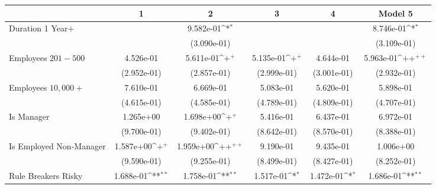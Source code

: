 {
\def\sym#1{\ifmmode^{#1}\else\(^{#1}\)\fi}
\begin{tabular}{l*{5}{c}}
    \toprule
                              & \multicolumn{1}{c}{1} & \multicolumn{1}{c}{2} & \multicolumn{1}{c}{3} & \multicolumn{1}{c}{4} & \multicolumn{1}{c}{Model 5} \\
    \midrule
    Duration 1 Year$+$        &                       & 9.582e-01\sym{*}      &                       &                       & 8.746e-01\sym{*}            \\
                              &                       & (3.090e-01)           &                       &                       & (3.109e-01)                 \\
    \addlinespace
    Employees $201-500$       & 4.526e-01             & 5.611e-01\sym{+}      & 5.135e-01\sym{+}      & 4.644e-01             & 5.963e-01\sym{++}           \\
                              & (2.952e-01)           & (2.857e-01)           & (2.999e-01)           & (3.001e-01)           & (2.932e-01)                 \\
    \addlinespace
    Employees $10,000+$       & 7.610e-01             & 6.669e-01             & 5.083e-01             & 5.620e-01             & 5.898e-01                   \\
                              & (4.615e-01)           & (4.585e-01)           & (4.789e-01)           & (4.809e-01)           & (4.707e-01)                 \\
    \addlinespace
    Is Manager                & 1.265e+00             & 1.698e+00\sym{+}      & 5.416e-01             & 6.437e-01             & 6.972e-01                   \\
                              & (9.700e-01)           & (9.402e-01)           & (8.642e-01)           & (8.570e-01)           & (8.388e-01)                 \\
    \addlinespace
    Is Employed Non-Manager   & 1.587e+00\sym{+}      & 1.959e+00\sym{++}     & 9.190e-01             & 9.435e-01             & 1.006e+00                   \\
                              & (9.590e-01)           & (9.255e-01)           & (8.499e-01)           & (8.427e-01)           & (8.252e-01)                 \\
    \addlinespace
    Rule Breakers Risky       & 1.688e-01\sym{**}     & 1.758e-01\sym{**}     & 1.517e-01\sym{*}      & 1.472e-01\sym{*}      & 1.686e-01\sym{**}           \\

\end{tabular}}
